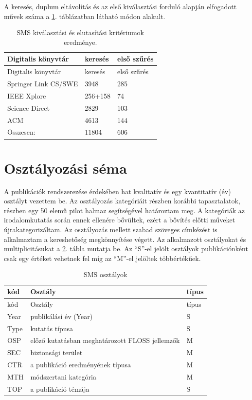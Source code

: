 \documentclass[12pt,magyar,a4paper,oneside]{scrreprt}
\begin{document}
A keresés, duplum eltávolítás és az első kiválasztási forduló alapján
elfogadott művek száma a \ref{tbl:SMSPubNum}. táblázatban látható módon
alakult.

\hypertarget{tbl:SMSPubNum}{}
\begin{longtable}[]{@{}lll@{}}
\caption{\label{tbl:SMSPubNum}SMS kiválasztási és elutasítási
kritériumok eredménye.}\tabularnewline
\toprule
Digitalis könyvtár & keresés & első szűrés\tabularnewline
\midrule
\endfirsthead
\toprule
Digitalis könyvtár & keresés & első szűrés\tabularnewline
\midrule
\endhead
Springer Link CS/SWE & 3948 & 285\tabularnewline
IEEE Xplore & 256+158 & 74\tabularnewline
Science Direct & 2829 & 103\tabularnewline
ACM & 4613 & 144\tabularnewline
Összesen: & 11804 & 606\tabularnewline
\bottomrule
\end{longtable}

\hypertarget{osztuxe1lyozuxe1si-suxe9ma}{%
\section{Osztályozási séma}\label{osztuxe1lyozuxe1si-suxe9ma}}

A publikációk rendszerezése érdekében hat kvalitatív és egy kvantitatív
(év) osztályt vezettem be. Az osztályozás kategóriáit részben korábbi
tapasztalatok, részben egy 50 elemű pilot halmaz segítségével határoztam
meg. A kategóriák az irodalomkutatás során ennek ellenére bővültek,
ezért a bővítés előtti műveket újrakategorizáltam. Az osztályozás
mellett szabad szöveges címkézést is alkalmaztam a kereshetőség
megkönnyítése végett. Az alkalmazott osztályokat és multiplicitásukat a
\ref{tbl:SMSClass}. tábla mutatja be. Az ``S''-el jelölt osztályok
publikációnként csak egy értéket vehetnek fel míg az ``M''-el jelöltek
többértékűek.

\hypertarget{tbl:SMSClass}{}
\begin{longtable}[]{@{}lll@{}}
\caption{\label{tbl:SMSClass}SMS osztályok}\tabularnewline
\toprule
kód & Osztály & típus\tabularnewline
\midrule
\endfirsthead
\toprule
kód & Osztály & típus\tabularnewline
\midrule
\endhead
Year & publikálási év (Year) & S\tabularnewline
Type & kutatás típusa & S\tabularnewline
OSP & előző kutatásban meghatározott FLOSS jellemzők & M\tabularnewline
SEC & biztonsági terület & M\tabularnewline
CTR & a publikáció eredményének típusa & M\tabularnewline
MTH & módszertani kategória & M\tabularnewline
TOP & a publikáció témája & S\tabularnewline
\bottomrule
\end{longtable}
\end{document}
